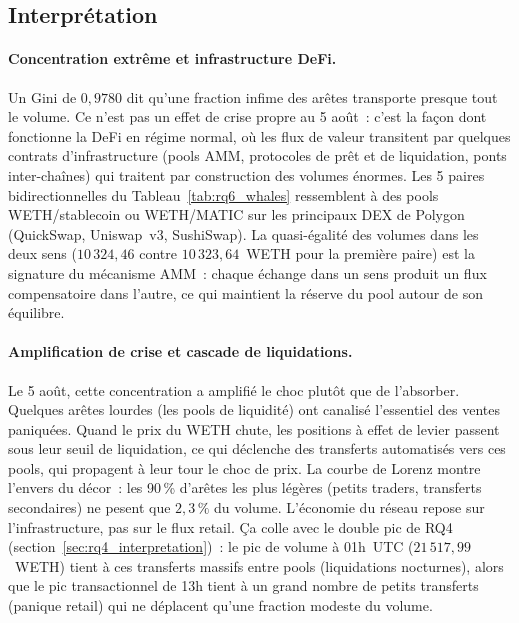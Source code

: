 \subsection{Interpr\'etation}
\label{sec:rq6_interpretation}

\paragraph{Concentration extr\^eme et infrastructure DeFi.}
Un Gini de $0{,}9780$ dit qu'une fraction infime des ar\^etes transporte
presque tout le volume. Ce n'est pas un effet de crise propre au 5 ao\^ut~:
c'est la fa\c{c}on dont fonctionne la DeFi en r\'egime normal, o\`u les flux
de valeur transitent par quelques contrats d'infrastructure (pools AMM,
protocoles de pr\^et et de liquidation, ponts inter-cha\^ines) qui traitent
par construction des volumes \'enormes. Les 5 paires bidirectionnelles du
Tableau~\ref{tab:rq6_whales} ressemblent \`a des pools WETH/stablecoin ou
WETH/MATIC sur les principaux DEX de Polygon (QuickSwap, Uniswap~v3,
SushiSwap). La quasi-\'egalit\'e des volumes dans les deux sens ($10\,324{,}46$
contre $10\,323{,}64$~WETH pour la premi\`ere paire) est la signature du
m\'ecanisme AMM~: chaque \'echange dans un sens produit un flux compensatoire
dans l'autre, ce qui maintient la r\'eserve du pool autour de son \'equilibre.

\paragraph{Amplification de crise et cascade de liquidations.}
Le 5 ao\^ut, cette concentration a amplifi\'e le choc plut\^ot que de
l'absorber. Quelques ar\^etes lourdes (les pools de liquidit\'e) ont
canalis\'e l'essentiel des ventes paniqu\'ees. Quand le prix du WETH chute,
les positions \`a effet de levier passent sous leur seuil de liquidation, ce
qui d\'eclenche des transferts automatis\'es vers ces pools, qui propagent
\`a leur tour le choc de prix. La courbe de Lorenz montre l'envers du
d\'ecor~: les 90\,\% d'ar\^etes les plus l\'eg\`eres (petits traders, transferts
secondaires) ne pesent que $2{,}3\,\%$ du volume. L'\'economie du r\'eseau
repose sur l'infrastructure, pas sur le flux retail. \c{C}a colle avec le
double pic de RQ4 (section~\ref{sec:rq4_interpretation})~: le pic de volume
\`a 01h~UTC ($21\,517{,}99$~WETH) tient \`a ces transferts massifs entre pools
(liquidations nocturnes), alors que le pic transactionnel de 13h tient \`a
un grand nombre de petits transferts (panique retail) qui ne d\'eplacent
qu'une fraction modeste du volume.

